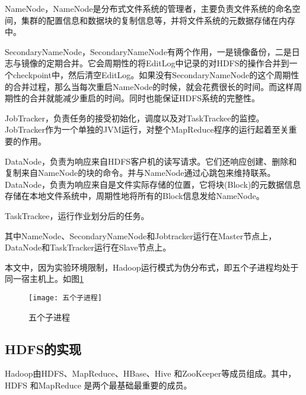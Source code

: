 NameNode，NameNode是分布式文件系统的管理者，主要负责文件系统的命名空间，集群的配置信息和数据块的复制信息等，并将文件系统的元数据存储在内存中。

SecondaryNameNode，SecondaryNameNode有两个作用，一是镜像备份，二是日志与镜像的定期合并。它会周期性的将EditLog中记录的对HDFS的操作合并到一个checkpoint中，然后清空EditLog。如果没有SecondaryNameNode的这个周期性的合并过程，那么当每次重启NameNode的时候，就会花费很长的时间。而这样周期性的合并就能减少重启的时间。同时也能保证HDFS系统的完整性。

JobTracker，负责任务的接受初始化，调度以及对TaskTrackee的监控。JobTracker作为一个单独的JVM运行，对整个MapReduce程序的运行起着至关重要的作用。

DataNode，负责为响应来自HDFS客户机的读写请求。它们还响应创建、删除和复制来自NameNode的块的命令。并与NameNode通过心跳包来维持联系。DataNode，负责为响应来自是文件实际存储的位置，它将块(Block)的元数据信息存储在本地文件系统中，周期性地将所有的Block信息发给NameNode。

TaskTrackee，运行作业划分后的任务。

其中NameNode、SecondaryNameNode和Jobtracker运行在Master节点上，DataNode和TaskTracker运行在Slave节点上。

本文中，因为实验环境限制，Hadoop运行模式为伪分布式，即五个子进程均处于同一宿主机上。如图\ref{fig:五个子进程}

\begin{figure}[h]
 \centering
 \texttt{[image: 五个子进程]}
 \caption{五个子进程}
 \label{fig:五个子进程}
\end{figure}



\subsection{HDFS的实现}
Hadoop由HDFS、MapReduce、HBase、Hive 和ZooKeeper等成员组成。其中，HDFS 和MapReduce 是两个最基础最重要的成员。

